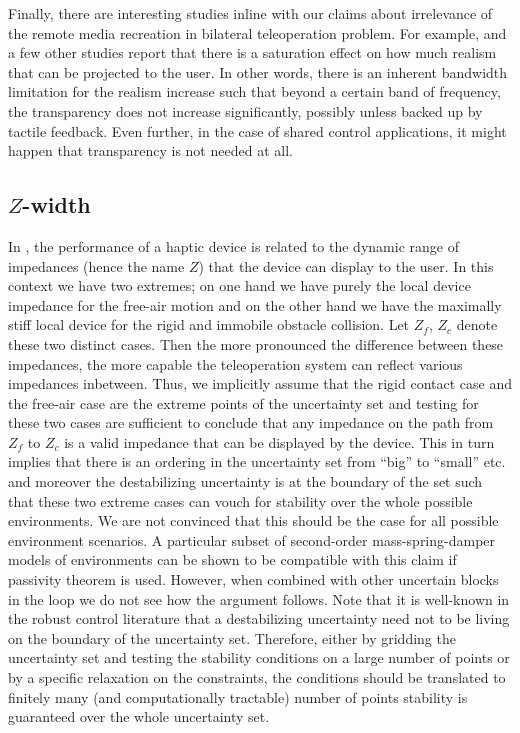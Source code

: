 Finally, there are interesting studies inline with our claims about irrelevance of the remote media recreation in bilateral
teleoperation problem. For example, \cite{kilchenman,wildenbeest,boessenkool} and a few other studies report that there is a saturation
effect on how much realism that can be projected to the user. In other words, there is an inherent bandwidth limitation for 
the realism increase such that beyond a certain band of frequency, the transparency does not increase significantly, possibly
unless backed up by tactile feedback. Even further, in the case of shared control applications, it might happen that transparency 
is not needed at all. 



\subsection{\texorpdfstring{$Z$}{Z}-width}

In \cite{colgate4}, the performance of a haptic device is related to the dynamic range of impedances (hence the name $Z$) that
the device can display to the user. In this context we have two extremes; on one hand we have purely the local device impedance 
for the free-air motion and on the other hand we have the maximally stiff local device for the rigid and immobile obstacle collision. 
Let $Z_f$, $Z_c$ denote these two distinct cases. Then the more pronounced the difference between these impedances, the more 
capable the teleoperation system can reflect various impedances inbetween. Thus, we implicitly assume that the rigid contact 
case and the free-air case are the extreme points of the uncertainty set and testing for these two cases are sufficient to 
conclude that any impedance on the path from $Z_f$ to $Z_c$ is a valid impedance that can be displayed by the device. This
in turn implies that there is an ordering in the uncertainty set from \enquote{big} to \enquote{small} etc. and moreover 
the destabilizing uncertainty is at the boundary of the set such that these two extreme cases can vouch for stability over 
the whole possible environments. We are not convinced that this should be the case for all possible environment 
scenarios. A particular subset of second-order mass-spring-damper models of environments can be shown to be compatible 
with this claim if passivity theorem is used. However, when combined with other uncertain blocks in the loop we do not see
how the argument follows. Note that it is well-known in the robust control literature that a destabilizing uncertainty need
not to be living on the boundary of the uncertainty set. Therefore, either by gridding the uncertainty set and testing the 
stability conditions on a large number of points or by a specific relaxation on the constraints, the conditions should be 
translated to finitely many (and computationally tractable) number of points stability is guaranteed over the whole 
uncertainty set.

